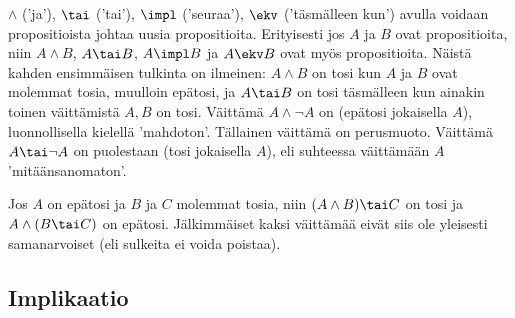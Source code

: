  $\wedge$ ('ja'), $\tai$ ('tai'), $\impl$ ('seuraa'), $\ekv$
('täsmälleen kun') avulla voidaan propositioista johtaa uusia propositioita. Erityisesti jos 
$A$ ja $B$ ovat propositioita, niin $A \wedge B$, $A \tai B$, $A \impl B$ ja $A \ekv B$ ovat
myös propositioita. Näistä kahden ensimmäisen tulkinta on  ilmeinen: $A \wedge B$ on tosi kun
$A$ ja $B$ ovat molemmat tosia, muulloin epätosi, ja $A \tai B$ on tosi täsmälleen kun ainakin
toinen  väittämistä $A,B$ on tosi.  Väittämä $A \wedge \neg A$ on  
(epätosi jokaisella $A$), luonnollisella kielellä 'mahdoton'. Tällainen väittämä on
 perusmuoto. Väittämä $A \tai \neg A$ on puolestaan 
 (tosi jokaisella $A$), eli suhteessa väittämään $A$ 'mitäänsanomaton'.
\begin{Exa} Jos $A$ on epätosi ja $B$ ja $C$ molemmat tosia, niin $(A \wedge B) \tai C$ on tosi
ja $A \wedge (B \tai C)$ on epätosi. Jälkimmäiset kaksi väittämää eivät siis ole yleisesti 
samanarvoiset (eli sulkeita ei voida poistaa). \loppu \end{Exa}

\subsection*{Implikaatio}

